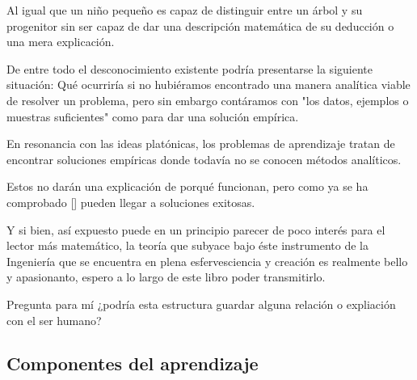 Al igual que un niño pequeño es capaz de distinguir entre un árbol y su progenitor sin ser
capaz de dar una descripción matemática de su deducción o una mera explicación.

De entre todo el desconocimiento existente podría presentarse la siguiente situación: 
Qué ocurriría si no hubiéramos encontrado una manera analítica viable de resolver un problema,
pero sin embargo 
contáramos con "los datos, ejemplos o muestras suficientes" como para dar una solución empírica. 


En resonancia con las ideas platónicas, los problemas de aprendizaje tratan de encontrar soluciones empíricas donde todavía 
no se conocen métodos analíticos. 

Estos no darán una explicación de porqué funcionan, pero como ya se ha comprobado [] pueden llegar a 
soluciones exitosas. 

Y si bien, así expuesto puede en un principio parecer de poco interés para el lector más matemático, 
la teoría que subyace bajo éste instrumento de la Ingeniería que se encuentra en plena esfervesciencia y  creación 
es realmente bello y apasionanto, espero a lo largo de este libro poder transmitirlo. 

Pregunta para mí ¿podría esta estructura guardar alguna relación o expliación con el ser humano?

\subsection{Componentes del aprendizaje}  

\endinput